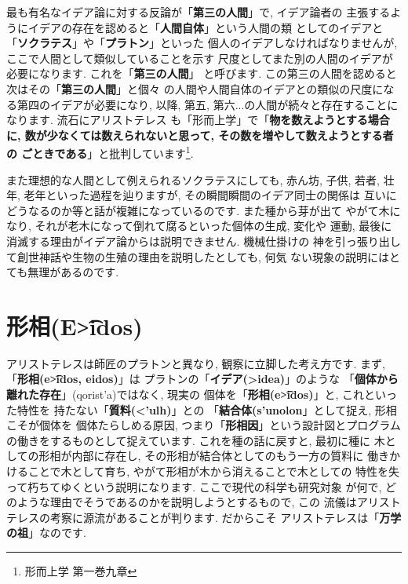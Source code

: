 最も有名なイデア論に対する反論が「\textbf{第三の人間}」で, イデア論者の
主張するようにイデアの存在を認めると「\textbf{人間自体}」という人間の類
としてのイデアと「\textbf{ソクラテス}」や「\textbf{プラトン}」といった
個人のイデアしなければなりませんが, ここで人間として類似していることを示す
尺度としてまた別の人間のイデアが必要になります. これを「\textbf{第三の人間}」
と呼びます. この第三の人間を認めると次はその「\textbf{第三の人間}」と個々
の人間や人間自体のイデアとの類似の尺度になる第四のイデアが必要になり, 以降,
 第五, 第六...の人間が続々と存在することになります.  流石にアリストテレス
も「形而上学」\cite{アリストテレス2}で「\textbf{物を数えようとする場合に,
 数が少なくては数えられないと思って, その数を増やして数えようとする者の
ごときである}」と批判しています\cite{アリストテレス2}\footnote{形而上学
 第一巻九章}.
\newline


また理想的な人間として例えられるソクラテスにしても, 赤ん坊, 子供, 若者,
 壮年, 老年といった過程を辿りますが, その瞬間瞬間のイデア同士の関係は
互いにどうなるのか等と話が複雑になっているのです. また種から芽が出て
やがて木になり, それが老木になって倒れて腐るといった個体の生成, 変化や
運動, 最後に消滅する理由がイデア論からは説明できません. 機械仕掛けの
神を引っ張り出して創世神話や生物の生殖の理由を説明したとしても, 何気
ない現象の説明にはとても無理があるのです.


\section{形相(\textgreek{E\t{>i}dos})}

アリストテレスは師匠のプラトンと異なり, 観察に立脚した考え方です.
 まず, 「\textbf{\textbf{形相(\textgreek{e\t{>i}dos}, eidos)}}」は
プラトンの「\textbf{イデア(\textgreek{>idea})}」のような
「\textbf{個体から離れた存在}」(\textgreek{qorist'a})ではなく, 現実の
個体を「\textbf{形相(\textgreek{e\t{>i}dos})}」と, これといった特性を
持たない「\textbf{質料(\textgreek{<'ulh})}」との
「\textbf{結合体(\textgreek{s'unolon}}」として捉え, 形相こそが個体を
個体たらしめる原因, つまり「\textbf{形相因}」という設計図とプログラム
の働きをするものとして捉えています. これを種の話に戻すと, 最初に種に
木としての形相が内部に存在し, その形相が結合体としてのもう一方の質料に
働きかけることで木として育ち, やがて形相が木から消えることで木としての
特性を失って朽ちてゆくという説明になります. ここで現代の科学も研究対象
が何で, どのような理由でそうであるのかを説明しようとするもので, この
流儀はアリストテレスの考察に源流があることが判ります. だからこそ
アリストテレスは「\textbf{万学の祖}」なのです.
\newline

